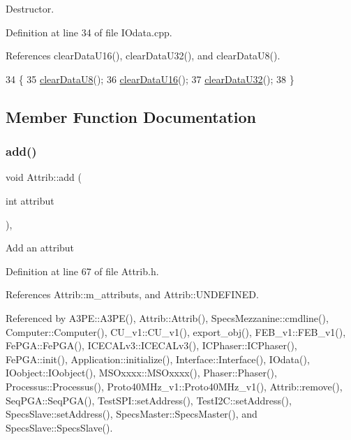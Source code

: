 Destructor. 



Definition at line 34 of file I\+Odata.\+cpp.



References clear\+Data\+U16(), clear\+Data\+U32(), and clear\+Data\+U8().


\begin{DoxyCode}
34                 \{
35   \hyperlink{classIOdata_a9bc3ea0458ea6d13bd751ac4c80a4be6}{clearDataU8}();
36   \hyperlink{classIOdata_a13016f489aba6e80cd7be53224c3e8ab}{clearDataU16}();
37   \hyperlink{classIOdata_a848de1b6e7b7207dbb53c102a4d911a9}{clearDataU32}();
38 \}
\end{DoxyCode}


\subsection{Member Function Documentation}
\mbox{\label{classAttrib_a235f773af19c900264a190b00a3b4ad7}} 
\subsubsection{\texorpdfstring{add()}{add()}}
{\footnotesize\ttfamily void Attrib\+::add (\begin{DoxyParamCaption}\item[{int}]{attribut }\end{DoxyParamCaption})\hspace{0.3cm}{\ttfamily [inline]}, {\ttfamily [inherited]}}

Add an attribut 

Definition at line 67 of file Attrib.\+h.



References Attrib\+::m\+\_\+attributs, and Attrib\+::\+U\+N\+D\+E\+F\+I\+N\+ED.



Referenced by A3\+P\+E\+::\+A3\+P\+E(), Attrib\+::\+Attrib(), Specs\+Mezzanine\+::cmdline(), Computer\+::\+Computer(), C\+U\+\_\+v1\+::\+C\+U\+\_\+v1(), export\+\_\+obj(), F\+E\+B\+\_\+v1\+::\+F\+E\+B\+\_\+v1(), Fe\+P\+G\+A\+::\+Fe\+P\+G\+A(), I\+C\+E\+C\+A\+Lv3\+::\+I\+C\+E\+C\+A\+Lv3(), I\+C\+Phaser\+::\+I\+C\+Phaser(), Fe\+P\+G\+A\+::init(), Application\+::initialize(), Interface\+::\+Interface(), I\+Odata(), I\+Oobject\+::\+I\+Oobject(), M\+S\+Oxxxx\+::\+M\+S\+Oxxxx(), Phaser\+::\+Phaser(), Processus\+::\+Processus(), Proto40\+M\+Hz\+\_\+v1\+::\+Proto40\+M\+Hz\+\_\+v1(), Attrib\+::remove(), Seq\+P\+G\+A\+::\+Seq\+P\+G\+A(), Test\+S\+P\+I\+::set\+Address(), Test\+I2\+C\+::set\+Address(), Specs\+Slave\+::set\+Address(), Specs\+Master\+::\+Specs\+Master(), and Specs\+Slave\+::\+Specs\+Slave().


